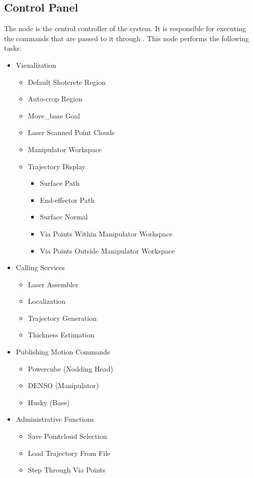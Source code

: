 \subsection{Control Panel}
The  node is the central controller of the system. It is responsible for executing the commands that are passed to it through . This node performs the following tasks:
\begin{itemize}
\item Visualization
\begin{itemize}
\item Default Shotcrete Region
\item Auto-crop Region
\item Move\_base Goal
\item Laser Scanned Point Clouds
\item Manipulator Workspace
\item Trajectory Display
\begin{itemize}
\item Surface Path
\item End-effector Path
\item Surface Normal
\item Via Points Within Manipulator Workspace
\item Via Points Outside Manipulator Workspace
\end{itemize}
\end{itemize}
\item Calling Services
\begin{itemize}
\item Laser Assembler
\item Localization
\item Trajectory Generation
\item Thickness Estimation
\end{itemize}
\item Publishing Motion Commands
\begin{itemize}
\item Powercube (Nodding Head)
\item DENSO (Manipulator)
\item Husky (Base)
\end{itemize}
\item Administrative Functions
\begin{itemize}
\item Save Pointcloud Selection
\item Load Trajectory From File
\item Step Through Via Points

\end{itemize}
\end{itemize}
